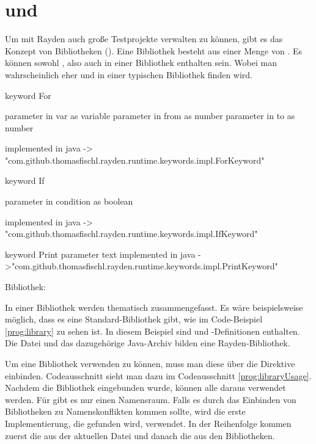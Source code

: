 \section{ und }

Um mit Rayden auch große Testprojekte verwalten zu können, gibt es das Konzept von Bibliotheken (). Eine Bibliothek besteht aus einer Menge von . Es können sowohl ,  also auch  in einer Bibliothek enthalten sein. Wobei man wahrscheinlich eher  und  in einer typischen Bibliothek finden wird.  

\begin{program}
\begin{JavaCode}
keyword For { 
	parameter in var as variable
	parameter in from as number
	parameter in to as number

	implemented in java -> "com.github.thomasfischl.rayden.runtime.keywords.impl.ForKeyword"
}

keyword If { 
	parameter in condition as boolean

	implemented in java -> "com.github.thomasfischl.rayden.runtime.keywords.impl.IfKeyword"
}

keyword Print {
	parameter text
	implemented in java ->"com.github.thomasfischl.rayden.runtime.keywords.impl.PrintKeyword"
}
\end{JavaCode}
\caption{Bibliothek: }
\label{prog:library}
\end{program}

\SuperPar
In einer Bibliothek werden  thematisch zusammengefasst. Es wäre beispielsweise möglich, dass es eine Standard-Bibliothek gibt, wie im Code-Beispiel \ref{prog:library} zu sehen ist. In diesem Beispiel sind  und -Definitionen enthalten. Die Datei  und das dazugehörige Java-Archiv bilden eine Rayden-Bibliothek. 

\SuperPar
Um eine Bibliothek verwenden zu können, muss man diese über die Direktive  einbinden. Codeausschnitt sieht man dazu im Codeausschnitt \ref{prog:libraryUsage}. Nachdem die Bibliothek eingebunden wurde, können alle  daraus verwendet werden. Für  gibt es nur einen Namensraum. Falls es durch das Einbinden von Bibliotheken zu Namenskonflikten kommen sollte, wird die erste Implementierung, die gefunden wird, verwendet. In der Reihenfolge kommen zuerst die  aus der aktuellen Datei und danach die  aus den Bibliotheken.

